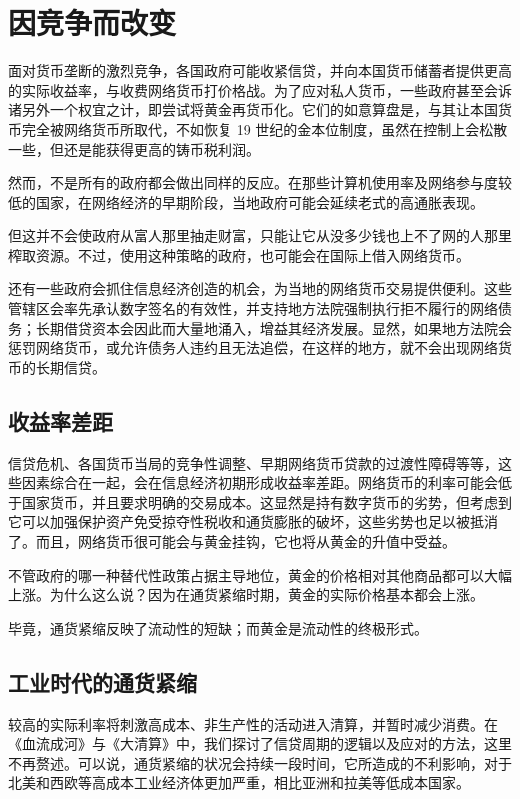 \section{因竞争而改变}
面对货币垄断的激烈竞争，各国政府可能收紧信贷，并向本国货币储蓄者提供更高的实际收益率，与收费网络货币打价格战。为了应对私人货币，一些政府甚至会诉诸另外一个权宜之计，即尝试将黄金再货币化。它们的如意算盘是，与其让本国货币完全被网络货币所取代，不如恢复 19 世纪的金本位制度，虽然在控制上会松散一些，但还是能获得更高的铸币税利润。

然而，不是所有的政府都会做出同样的反应。在那些计算机使用率及网络参与度较低的国家，在网络经济的早期阶段，当地政府可能会延续老式的高通胀表现。

但这并不会使政府从富人那里抽走财富，只能让它从没多少钱也上不了网的人那里榨取资源。不过，使用这种策略的政府，也可能会在国际上借入网络货币。

还有一些政府会抓住信息经济创造的机会，为当地的网络货币交易提供便利。这些管辖区会率先承认数字签名的有效性，并支持地方法院强制执行拒不履行的网络债务；长期借贷资本会因此而大量地涌入，增益其经济发展。显然，如果地方法院会惩罚网络货币，或允许债务人违约且无法追偿，在这样的地方，就不会出现网络货币的长期信贷。

\subsection{收益率差距}
信贷危机、各国货币当局的竞争性调整、早期网络货币贷款的过渡性障碍等等，这些因素综合在一起，会在信息经济初期形成收益率差距。网络货币的利率可能会低于国家货币，并且要求明确的交易成本。这显然是持有数字货币的劣势，但考虑到它可以加强保护资产免受掠夺性税收和通货膨胀的破坏，这些劣势也足以被抵消了。而且，网络货币很可能会与黄金挂钩，它也将从黄金的升值中受益。

不管政府的哪一种替代性政策占据主导地位，黄金的价格相对其他商品都可以大幅上涨。为什么这么说？因为在通货紧缩时期，黄金的实际价格基本都会上涨。

毕竟，通货紧缩反映了流动性的短缺；而黄金是流动性的终极形式。

\subsection{工业时代的通货紧缩}
较高的实际利率将刺激高成本、非生产性的活动进入清算，并暂时减少消费。在《血流成河》与《大清算》中，我们探讨了信贷周期的逻辑以及应对的方法，这里不再赘述。可以说，通货紧缩的状况会持续一段时间，它所造成的不利影响，对于北美和西欧等高成本工业经济体更加严重，相比亚洲和拉美等低成本国家。

